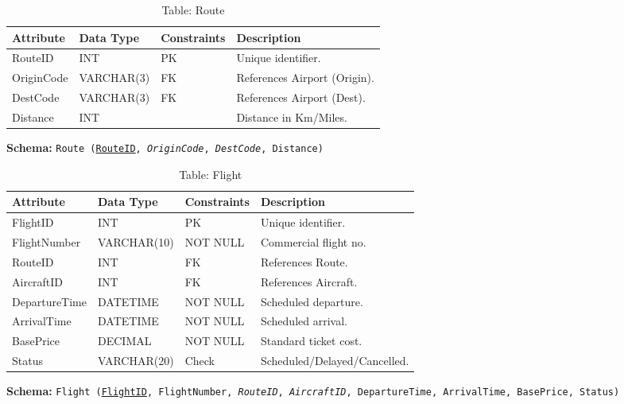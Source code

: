 \documentclass[12pt, a4paper]{article}
\begin{document}
	\begin{table}[H]
		\centering
		\caption{Table: Route}
		\begin{tabular}{|l|l|l|p{5cm}|}
			\hline
			\textbf{Attribute} & \textbf{Data Type} & \textbf{Constraints} & \textbf{Description} \\
			\hline
			RouteID & INT & PK & Unique identifier. \\
			\hline
			OriginCode & VARCHAR(3) & FK & References Airport (Origin). \\
			\hline
			DestCode & VARCHAR(3) & FK & References Airport (Dest). \\
			\hline
			Distance & INT & & Distance in Km/Miles. \\
			\hline
		\end{tabular}
	\end{table}
	\noindent \textbf{Schema:} \texttt{Route (\underline{RouteID}, \textit{OriginCode}, \textit{DestCode}, Distance)}
	
	\begin{table}[H]
		\centering
		\caption{Table: Flight}
		\begin{tabular}{|l|l|l|p{5cm}|}
			\hline
			\textbf{Attribute} & \textbf{Data Type} & \textbf{Constraints} & \textbf{Description} \\
			\hline
			FlightID & INT & PK & Unique identifier. \\
			\hline
			FlightNumber & VARCHAR(10) & NOT NULL & Commercial flight no. \\
			\hline
			RouteID & INT & FK & References Route. \\
			\hline
			AircraftID & INT & FK & References Aircraft. \\
			\hline
			DepartureTime & DATETIME & NOT NULL & Scheduled departure. \\
			\hline
			ArrivalTime & DATETIME & NOT NULL & Scheduled arrival. \\
			\hline
			BasePrice & DECIMAL & NOT NULL & Standard ticket cost. \\
			\hline
			Status & VARCHAR(20) & Check & Scheduled/Delayed/Cancelled. \\
			\hline
		\end{tabular}
	\end{table}
	\noindent \textbf{Schema:} \texttt{Flight (\underline{FlightID}, FlightNumber, \textit{RouteID}, \textit{AircraftID}, DepartureTime, ArrivalTime, BasePrice, Status)}
	
\end{document}
